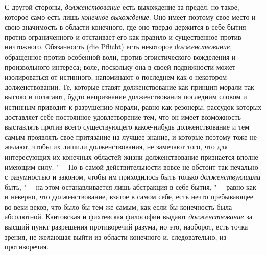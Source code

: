 С другой стороны, {\em долженствование} есть выхождение
за предел, но такое, которое само есть лишь
{\em конечное выхождение}. Оно имеет поэтому свое место
и свою значимость в области конечного, где оно твердо держится в-себе-бытия
против ограниченного и отстаивает его как правило и существенное против
ничтожного. Обязанность (die Pflicht) есть некоторое
{\em долженствование}, обращенное против особенной
воли, против эгоистического вожделения и произвольного интереса; воле,
поскольку она в своей подвижности может изолироваться от истинного,
напоминают о последнем как о некотором долженствовании. Те, которые ставят
долженствование как принцип морали так высоко и полагают, будто непризнание
долженствования последним словом и истинным приводит к разрушению морали,
равно как резонеры, рассудок которых доставляет себе постоянное
удовлетворение тем, что он имеет возможность выставлять против всего
существующего какое-нибудь долженствование и тем самым проявлять свое
притязание на лучшее знание, и которые поэтому тоже не желают, чтобы их лишили
долженствования, не замечают того, что для интересующих их конечных
областей жизни долженствование признается вполне имеющим силу. "--- Но в самой
действительности вовсе не обстоит так печально с разумностью и законом,
чтобы им приходилось быть только {\em долженствующими}
быть, "--- на этом останавливается лишь абстракция в-себе-бытия, "--- равно как и
неверно, что долженствование, взятое в самом себе, есть нечто пребывающее
во веки веков, что было бы тем же самым, как если бы конечность была
абсолютной. Кантовская и фихтевская философии выдают
{\em долженствование} за высший пункт разрешения
противоречий разума, но это, наоборот, есть точка зрения, не желающая выйти
из области конечного и, следовательно, из противоречия.


